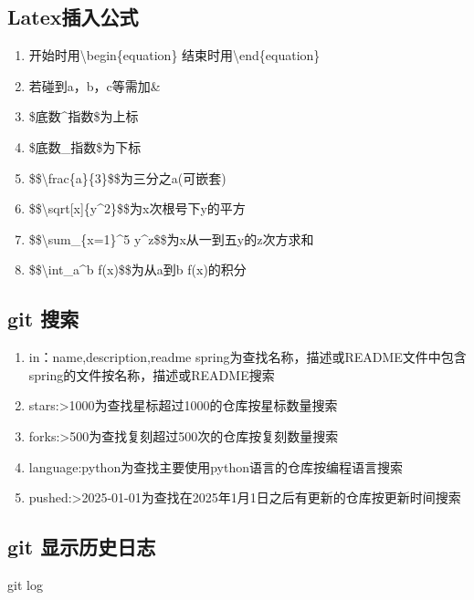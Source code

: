 \documentclass{article}
\begin{document}
\subsection{Latex插入公式}
\begin{enumerate}
\item 开始时用\textbackslash{begin\{equation\}}\newline
 结束时用\textbackslash{end\{equation\}}\newline
\item 若碰到a，b，c等需加\&\newline
\item \$底数\^{}指数\$为上标\newline
\item \$底数\_指数\$为下标\newline
\item \$\$\textbackslash{frac\{a\}\{3\}}\$\$为三分之a(可嵌套)\newline
\item \$\$\textbackslash{sqrt[x]\{y\^{}2\}}\$\$为x次根号下y的平方\newline
\item \$\$\textbackslash{}sum\_\{x=1\}\^{}5 y\^{}z\$\$为x从一到五y的z次方求和\newline
\item \$\$\textbackslash{}int\_a\^{}b f(x)\$\$为从a到b f(x)的积分
\end{enumerate}
\subsection{git 搜索}
\begin{enumerate}
\item in：name,description,readme spring为查找名称，描述或README文件中包含spring的文件按名称，描述或README搜索\newline
\item stars:>1000为查找星标超过1000的仓库按星标数量搜索\newline
\item forks:>500为查找复刻超过500次的仓库按复刻数量搜索\newline
\item language:python为查找主要使用python语言的仓库按编程语言搜索\newline
\item pushed:>2025-01-01为查找在2025年1月1日之后有更新的仓库按更新时间搜索\newline
\end{enumerate}
\subsection{git 显示历史日志}
git log
\end{document}
